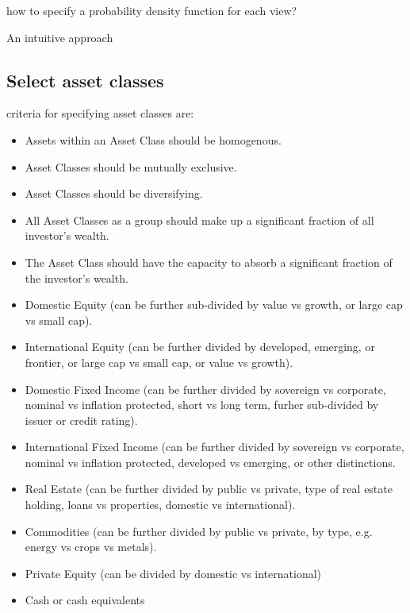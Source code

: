 \documentclass[presentation]{beamer}
\begin{document}
how to specify a probability density function for each view?


\begin{frame}[label={sec:orgheadline29}]{An intuitive approach}
\end{frame}

\subsection{Select asset classes}
\label{sec:orgheadline31}
criteria for specifying asset classes are:
\begin{itemize}
\item Assets within an Asset Class should be homogenous.
\item Asset Classes should be mutually exclusive.
\item Asset Classes should be diversifying.
\item All Asset Classes as a group should make up a significant fraction of all investor's wealth.
\item The Asset Class should have the capacity to absorb a significant fraction of the investor's wealth.
\end{itemize}


\begin{itemize}
\item Domestic Equity (can be further sub-divided by value vs growth, or large cap vs small cap).
\item International Equity (can be further divided by developed, emerging, or frontier, or large cap vs small cap, or value vs growth).
\item Domestic Fixed Income (can be further divided by sovereign vs corporate, nominal vs inflation protected, short vs long term, furher sub-divided by issuer or credit rating).
\item International Fixed Income (can be further divided by sovereign vs corporate, nominal vs inflation protected, developed vs emerging, or other distinctions.
\item Real Estate (can be further divided by public vs private, type of real estate holding, loans vs properties, domestic vs international).
\item Commodities (can be further divided by public vs private, by type, e.g. energy vs crops vs metals).
\item Private Equity (can be divided by domestic vs international)
\item Cash or cash equivalents
\end{itemize}
\end{document}
